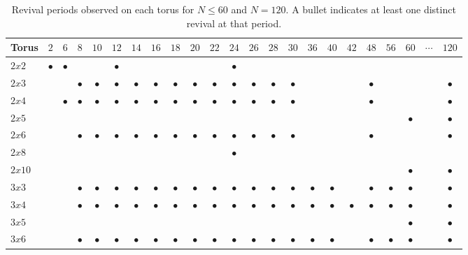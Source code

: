 \documentclass[aps,pra,reprint,amsmath,amssymb,superscriptaddress,floatfix]{revtex4-2}
\def\times{x}%
\begin{document}
\begin{table}[htbp]
\centering
\caption{Revival periods observed on each torus for $N \le 60$ and
$N = 120$. A bullet indicates at least one distinct revival at that
period.}
\label{tab:torus-period-n60}
\begin{tabular}{lcccccccccccccccccccccc}
\toprule
Torus & $2$ & $6$ & $8$ & $10$ & $12$ & $14$ & $16$ & $18$ & $20$ & $22$ & $24$ & $26$ & $28$ & $30$ & $36$ & $40$ & $42$ & $48$ & $56$ & $60$ & $\cdots$ & $120$ \\
\midrule
$2\times2$  & $\bullet$ & $\bullet$ &  &  & $\bullet$ &  &  &  &  &  & $\bullet$ &  &  &  &  &  &  &  &  &  &  &  \\
$2\times3$  &  &  & $\bullet$ & $\bullet$ & $\bullet$ & $\bullet$ & $\bullet$ & $\bullet$ & $\bullet$ & $\bullet$ & $\bullet$ & $\bullet$ & $\bullet$ & $\bullet$ &  &  &  & $\bullet$ &  &  &  & $\bullet$ \\
$2\times4$  &  & $\bullet$ & $\bullet$ & $\bullet$ & $\bullet$ & $\bullet$ & $\bullet$ & $\bullet$ & $\bullet$ & $\bullet$ & $\bullet$ & $\bullet$ & $\bullet$ & $\bullet$ &  &  &  & $\bullet$ &  &  &  & $\bullet$ \\
$2\times5$  &  &  &  &  &  &  &  &  &  &  &  &  &  &  &  &  &  &  &  & $\bullet$ &  & $\bullet$ \\
$2\times6$  &  &  & $\bullet$ & $\bullet$ & $\bullet$ & $\bullet$ & $\bullet$ & $\bullet$ & $\bullet$ & $\bullet$ & $\bullet$ & $\bullet$ & $\bullet$ & $\bullet$ &  &  &  & $\bullet$ &  &  &  & $\bullet$ \\
$2\times8$  &  &  &  &  &  &  &  &  &  &  & $\bullet$ &  &  &  &  &  &  &  &  &  &  &  \\
$2\times10$ &  &  &  &  &  &  &  &  &  &  &  &  &  &  &  &  &  &  &  & $\bullet$ &  & $\bullet$ \\
$3\times3$  &  &  & $\bullet$ & $\bullet$ & $\bullet$ & $\bullet$ & $\bullet$ & $\bullet$ & $\bullet$ & $\bullet$ & $\bullet$ & $\bullet$ & $\bullet$ & $\bullet$ & $\bullet$ & $\bullet$ &  & $\bullet$ & $\bullet$ & $\bullet$ &  & $\bullet$ \\
$3\times4$  &  &  & $\bullet$ & $\bullet$ & $\bullet$ & $\bullet$ & $\bullet$ & $\bullet$ & $\bullet$ & $\bullet$ & $\bullet$ & $\bullet$ & $\bullet$ & $\bullet$ & $\bullet$ & $\bullet$ & $\bullet$ & $\bullet$ & $\bullet$ & $\bullet$ &  & $\bullet$ \\
$3\times5$  &  &  &  &  &  &  &  &  &  &  &  &  &  &  &  &  &  &  &  & $\bullet$ &  & $\bullet$ \\
$3\times6$  &  &  & $\bullet$ & $\bullet$ & $\bullet$ & $\bullet$ & $\bullet$ & $\bullet$ & $\bullet$ & $\bullet$ & $\bullet$ & $\bullet$ & $\bullet$ & $\bullet$ & $\bullet$ & $\bullet$ &  & $\bullet$ & $\bullet$ & $\bullet$ &  & $\bullet$ \\

\end{tabular}
\end{table}
\end{document}
